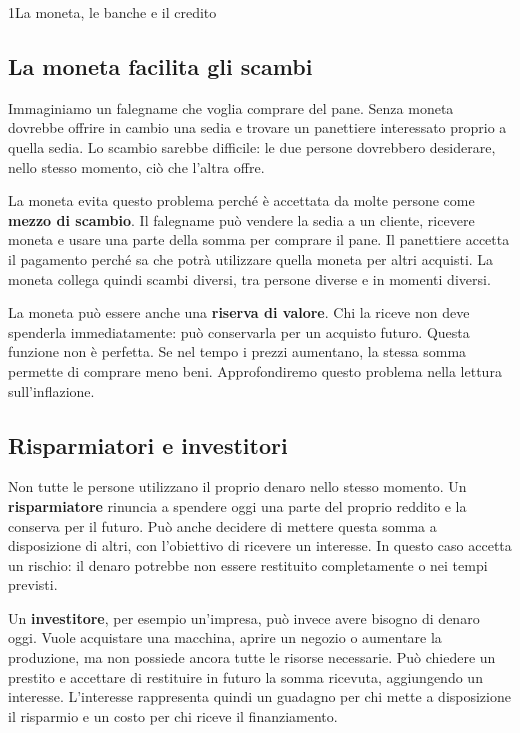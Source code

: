\begin{lettura}{1}{La moneta, le banche e il credito}


\subsection*{La moneta facilita gli scambi}
Immaginiamo un falegname che voglia comprare del pane. Senza moneta dovrebbe offrire in cambio una sedia e trovare un panettiere interessato proprio a quella sedia. Lo scambio sarebbe difficile: le due persone dovrebbero desiderare, nello stesso momento, ciò che l'altra offre.

La moneta evita questo problema perché è accettata da molte persone come \textbf{mezzo di scambio}. Il falegname può vendere la sedia a un cliente, ricevere moneta e usare una parte della somma per comprare il pane. Il panettiere accetta il pagamento perché sa che potrà utilizzare quella moneta per altri acquisti. La moneta collega quindi scambi diversi, tra persone diverse e in momenti diversi.

La moneta può essere anche una \textbf{riserva di valore}. Chi la riceve non deve spenderla immediatamente: può conservarla per un acquisto futuro. Questa funzione non è perfetta. Se nel tempo i prezzi aumentano, la stessa somma permette di comprare meno beni. Approfondiremo questo problema nella lettura sull'inflazione.

\subsection*{Risparmiatori e investitori}
Non tutte le persone utilizzano il proprio denaro nello stesso momento. Un \textbf{risparmiatore} rinuncia a spendere oggi una parte del proprio reddito e la conserva per il futuro. Può anche decidere di mettere questa somma a disposizione di altri, con l'obiettivo di ricevere un interesse. In questo caso accetta un rischio: il denaro potrebbe non essere restituito completamente o nei tempi previsti.

Un \textbf{investitore}, per esempio un'impresa, può invece avere bisogno di denaro oggi. Vuole acquistare una macchina, aprire un negozio o aumentare la produzione, ma non possiede ancora tutte le risorse necessarie. Può chiedere un prestito e accettare di restituire in futuro la somma ricevuta, aggiungendo un interesse. L'interesse rappresenta quindi un guadagno per chi mette a disposizione il risparmio e un costo per chi riceve il finanziamento.


\end{lettura}
